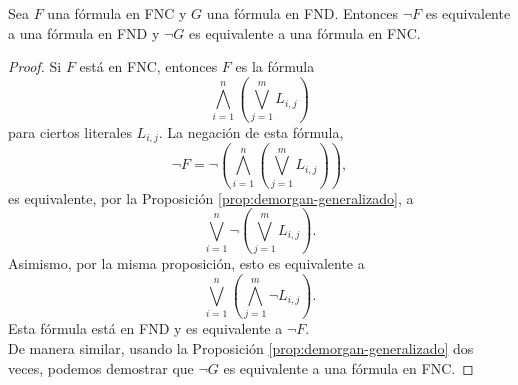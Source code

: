 \documentclass[12pt,a4paper]{book}
\begin{document}
    \begin{lema}\label{lema:negacion-fnc-fnd}
        Sea $F$ una fórmula en FNC y $G$ una fórmula en FND. Entonces $\neg F$ es equivalente a una fórmula en FND y $\neg G$
        es equivalente a una fórmula en FNC.
    \end{lema}
    \begin{proof}
        Si $F$ está en FNC, entonces $F$ es la fórmula
        \begin{equation*}
            \bigwedge_{i=1}^{n}\left(\bigvee_{j=1}^{m}L_{i,j}\right)
        \end{equation*}
        para ciertos literales $L_{i,j}$. La negación de esta fórmula,
        \begin{equation*}
            \neg F=\neg\left(\bigwedge_{i=1}^{n}\left(\bigvee_{j=1}^{m}L_{i,j}\right)\right),
        \end{equation*}
        es equivalente, por la Proposición \ref{prop:demorgan-generalizado}, a
        \begin{equation*}
            \bigvee_{i=1}^{n}\neg\left(\bigvee_{j=1}^{m}L_{i,j}\right).
        \end{equation*}
        Asimismo, por la misma proposición, esto es equivalente a
        \begin{equation*}
            \bigvee_{i=1}^{n}\left(\bigwedge_{j=1}^{m}\neg L_{i,j}\right).
        \end{equation*}
        Esta fórmula está en FND y es equivalente a $\neg F$.\\
        De manera similar, usando la Proposición \ref{prop:demorgan-generalizado} dos veces, podemos demostrar que $\neg G$
        es equivalente a una fórmula en FNC.
    \end{proof}
\end{document}
